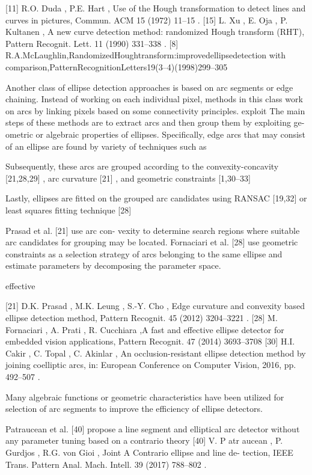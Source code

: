 \documentclass[a4paper]{report}
\begin{document}
[11] R.O. Duda , P.E. Hart , Use of the Hough transformation to detect lines and curves in pictures, Commun. ACM 15 (1972) 11–15 .
[15] L. Xu , E. Oja , P. Kultanen , A new curve detection method: randomized Hough transform (RHT), Pattern Recognit. Lett. 11 (1990) 331–338 .
[8] R.A.McLaughlin,RandomizedHoughtransform:improvedellipsedetection
with comparison,PatternRecognitionLetters19(3–4)(1998)299–305

Another class of ellipse detection approaches is based on arc segments or edge chaining. 
Instead of working on each individual pixel, methods in this class work on arcs by linking pixels based on some connectivity principles.
exploit
The main steps of these methods are to extract arcs and then group them by exploiting ge- ometric or algebraic properties of ellipses.
Specifically, edge arcs that may consist of an ellipse are found by variety of techniques such as

Subsequently, these arcs are grouped according to the convexity-concavity [21,28,29] , arc curvature [21] , and geometric constraints [1,30–33] 

Lastly, ellipses are fitted on the grouped arc candidates using RANSAC [19,32] or least squares fitting technique [28]

Prasad et al. [21] use arc con- vexity to determine search regions where suitable arc candidates for grouping may be located. Fornaciari et al. [28] use geometric constraints as a selection strategy of arcs belonging to the same ellipse and estimate parameters by decomposing the parameter space.

effective

[21] D.K. Prasad , M.K. Leung , S.-Y. Cho , Edge curvature and convexity based ellipse detection method, Pattern Recognit. 45 (2012) 3204–3221 .
[28] M. Fornaciari , A. Prati , R. Cucchiara ,A fast and effective ellipse detector for embedded vision applications, Pattern Recognit. 47 (2014) 3693–3708
[30] H.I. Cakir , C. Topal , C. Akinlar , An occlusion-resistant ellipse detection method by joining coelliptic arcs, in: European Conference on Computer Vision, 2016, pp. 492–507 .


Many algebraic functions or geometric characteristics have been utilized for selection of arc segments to improve the efficiency of ellipse detectors.

Patraucean et al. [40] propose a line segment and elliptical arc detector without any parameter tuning based on a contrario theory
[40] V. P atr aucean , P. Gurdjos , R.G. von Gioi , Joint A Contrario ellipse and line de- tection, IEEE Trans. Pattern Anal. Mach. Intell. 39 (2017) 788–802 .
\end{document}
